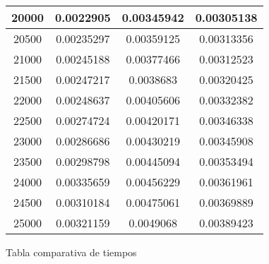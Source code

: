 \documentclass{article}
\begin{document}
\begin{longtable}{|c|c|c|c|}
		    20000  &  0.0022905	    &   0.00345942	 &  0.00305138  \\ \hline
		    20500  &  0.00235297    & 	0.00359125	 &  0.00313356  \\ \hline
		    21000  &  0.00245188    & 	0.00377466	 &  0.00312523  \\ \hline
		    21500  &  0.00247217    & 	0.0038683	 &  0.00320425  \\ \hline
		    22000  &  0.00248637    & 	0.00405606	 &  0.00332382  \\ \hline
		    22500  &  0.00274724    & 	0.00420171	 &  0.00346338  \\ \hline
		    23000  &  0.00286686    & 	0.00430219	 &  0.00345908  \\ \hline
	     	23500  &  0.00298798    & 	0.00445094	 &  0.00353494  \\ \hline
		    24000  &  0.00335659    & 	0.00456229	 &  0.00361961  \\ \hline
		    24500  &  0.00310184    & 	0.00475061	 &  0.00369889  \\ \hline
		    25000  &  0.00321159    & 	0.0049068	 &  0.00389423  \\ \hline
		\end{longtable}
		\begin{center}
		\tiny Tabla comparativa de tiempos
		\end{center}
\end{document}
